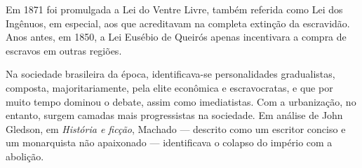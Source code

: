 Em 1871 foi promulgada a Lei do Ventre Livre, também referida como Lei dos Ingênuos, em especial, aos que acreditavam na completa extinção da escravidão. Anos antes, em 1850, a Lei Eusébio de Queirós apenas incentivara a compra de escravos em outras regiões.

Na sociedade brasileira da época, identificava-se personalidades gradualistas, composta, majoritariamente, pela elite econômica e escravocratas, e que por muito tempo dominou o debate, assim como imediatistas. Com a urbanização, no entanto, surgem camadas mais progressistas na sociedade. Em análise de John Gledson, em \textit{História e ficção}, Machado — descrito como um escritor conciso e um monarquista não apaixonado — identificava o colapso do império com a abolição.